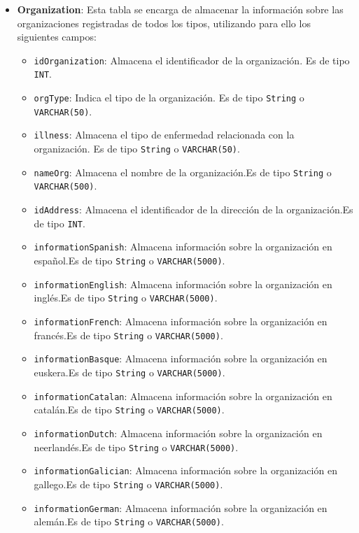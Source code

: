 \begin{itemize}
      

    \item \textbf{Organization}: Esta tabla se encarga de almacenar la información sobre las organizaciones registradas de todos los tipos, utilizando para ello los siguientes campos:
        \begin{itemize}
        \item \texttt{idOrganization}: Almacena el identificador de la organización. Es de tipo \texttt{INT}.
        \item \texttt{orgType}: Indica el tipo de la organización. Es de tipo \texttt{String} o \texttt{VARCHAR(50)}.
        \item \texttt{illness}: Almacena el tipo de enfermedad relacionada con la organización. Es de tipo \texttt{String} o \texttt{VARCHAR(50)}.
        \item \texttt{nameOrg}: Almacena el nombre de la organización.Es de tipo \texttt{String} o \texttt{VARCHAR(500)}.
        \item \texttt{idAddress}: Almacena el identificador de la dirección de la organización.Es de tipo \texttt{INT}.
        \item \texttt{informationSpanish}: Almacena información sobre la organización en español.Es de tipo \texttt{String} o \texttt{VARCHAR(5000)}.
        \item \texttt{informationEnglish}: Almacena información sobre la organización en inglés.Es de tipo \texttt{String} o \texttt{VARCHAR(5000)}.
        \item \texttt{informationFrench}: Almacena información sobre la organización en francés.Es de tipo \texttt{String} o \texttt{VARCHAR(5000)}.
        \item \texttt{informationBasque}: Almacena información sobre la organización en euskera.Es de tipo \texttt{String} o \texttt{VARCHAR(5000)}.
        \item \texttt{informationCatalan}: Almacena información sobre la organización en catalán.Es de tipo \texttt{String} o \texttt{VARCHAR(5000)}.
        \item \texttt{informationDutch}: Almacena información sobre la organización en neerlandés.Es de tipo \texttt{String} o \texttt{VARCHAR(5000)}.
        \item \texttt{informationGalician}: Almacena información sobre la organización en gallego.Es de tipo \texttt{String} o \texttt{VARCHAR(5000)}.
        \item \texttt{informationGerman}: Almacena información sobre la organización en alemán.Es de tipo \texttt{String} o \texttt{VARCHAR(5000)}.

\end{itemize}
\end{itemize}
